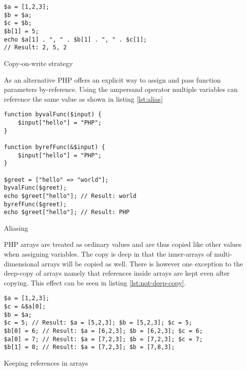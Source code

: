\begin{program}
\begin{lstlisting}
$a = [1,2,3];
$b = $a;
$c = $b;
$b[1] = 5;
echo $a[1] . ", " . $b[1] . ", " . $c[1];
// Result: 2, 5, 2
\end{lstlisting}
\caption{Copy-on-write strategy}
\label{lst:copy-on-write}
\end{program}

As an alternative PHP offers an explicit way to assign and pass function parameters by-reference. Using the ampersand operator multiple variables can reference the same value as shown in listing \ref{lst:alias}

\begin{program}
\begin{lstlisting}
function byvalFunc($input) {
    $input["hello"] = "PHP";
}

function byrefFunc(&$input) {
    $input["hello"] = "PHP";
}

$greet = ["hello" => "world"];
byvalFunc($greet);
echo $greet["hello"]; // Result: world
byrefFunc($greet);
echo $greet["hello"]; // Result: PHP
\end{lstlisting}
\caption{Aliasing}
\label{lst:alias}
\end{program}

PHP arrays are treated as ordinary values and are thus copied like other values when assigning variables. The copy is deep in that the inner-arrays of multi-dimensional arrays will be copied as well. There is however one exception to the deep-copy of arrays namely that references inside arrays are kept even after copying. This effect can be seen in listing \ref{lst:not-deep-copy}.

\begin{program}
\begin{lstlisting}
$a = [1,2,3];
$c = &$a[0];
$b = $a;
$c = 5; // Result: $a = [5,2,3]; $b = [5,2,3]; $c = 5;
$b[0] = 6; // Result: $a = [6,2,3]; $b = [6,2,3]; $c = 6;
$a[0] = 7; // Result: $a = [7,2,3]; $b = [7,2,3]; $c = 7;
$b[1] = 8; // Result: $a = [7,2,3]; $b = [7,8,3];
\end{lstlisting}
\caption{Keeping references in arrays}
\label{lst:not-deep-copy}
\end{program}